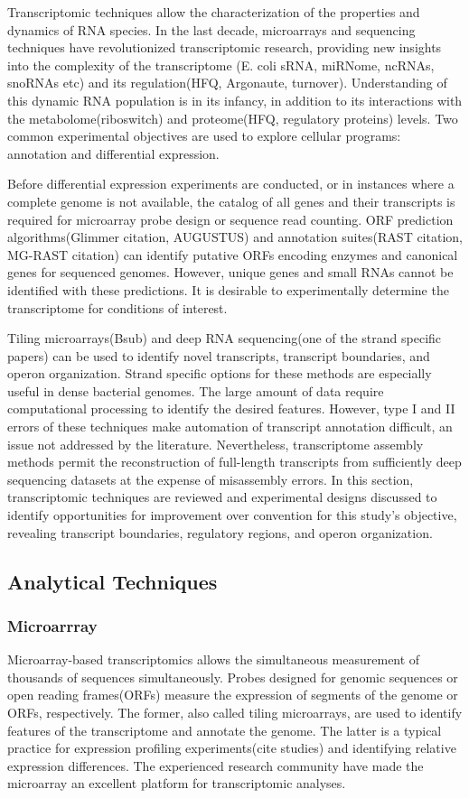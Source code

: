 Transcriptomic techniques allow the characterization of the properties and dynamics of RNA species. In the last decade, microarrays and sequencing techniques have revolutionized transcriptomic research, providing new insights into the complexity of the transcriptome (E. coli sRNA, miRNome, ncRNAs, snoRNAs etc) and its regulation(HFQ, Argonaute, turnover). Understanding of this dynamic RNA population is in its infancy, in addition to its interactions with the metabolome(riboswitch) and proteome(HFQ, regulatory proteins) levels. Two common experimental objectives are used to explore cellular programs: annotation and differential expression.

Before differential expression experiments are conducted, or in instances where a complete genome is not available, the catalog of all genes and their transcripts is required for microarray probe design or sequence read counting. ORF prediction algorithms(Glimmer citation, AUGUSTUS) and annotation suites(RAST citation, MG-RAST citation) can identify putative ORFs encoding enzymes and canonical genes for sequenced genomes. However, unique genes and small RNAs cannot be identified with these predictions. It is desirable to experimentally determine the transcriptome for conditions of interest.

Tiling microarrays(Bsub) and deep RNA sequencing(one of the strand specific papers) can be used to identify novel transcripts, transcript boundaries, and operon organization. Strand specific options for these methods are especially useful in dense bacterial genomes. The large amount of data require computational processing to identify the desired features. However, type I and II errors of these techniques make automation of transcript annotation difficult, an issue not addressed by the literature. Nevertheless, transcriptome assembly methods permit the reconstruction of full-length transcripts from sufficiently deep sequencing datasets at the expense of misassembly errors. In this section, transcriptomic techniques are reviewed and experimental designs discussed to identify opportunities for improvement over convention for this study's objective, revealing transcript boundaries, regulatory regions, and operon organization.

\subsection{Analytical Techniques}
\subsubsection{Microarrray}
Microarray-based transcriptomics allows the simultaneous measurement of thousands of sequences simultaneously. Probes designed for genomic sequences or open reading frames(ORFs) measure the expression of segments of the genome or ORFs, respectively. The former, also called tiling microarrays, are used to identify features of the transcriptome and annotate the genome. The latter is a typical practice for expression profiling experiments(cite studies) and identifying relative expression differences. The experienced research community have made the microarray an excellent platform for transcriptomic analyses.

